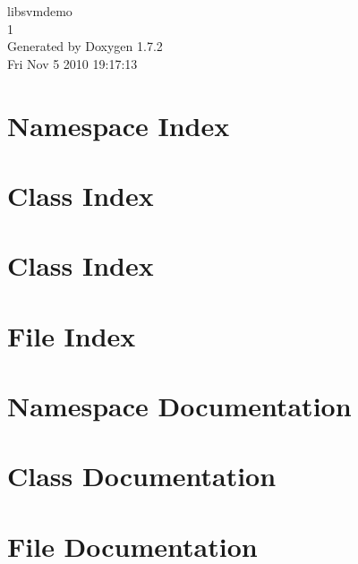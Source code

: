 \documentclass[a4paper]{book}
\begin{document}
\hypersetup{pageanchor=false}
\begin{titlepage}
\vspace*{7cm}
\begin{center}
{\Large libsvmdemo \\[1ex]\large 1 }\\
\vspace*{1cm}
{\large Generated by Doxygen 1.7.2}\\
\vspace*{0.5cm}
{\small Fri Nov 5 2010 19:17:13}\\
\end{center}
\end{titlepage}
\clearemptydoublepage
{}
\tableofcontents
\clearemptydoublepage
{}
\hypersetup{pageanchor=true}
\chapter{Namespace Index}

\chapter{Class Index}

\chapter{Class Index}

\chapter{File Index}

\chapter{Namespace Documentation}



\chapter{Class Documentation}



















\chapter{File Documentation}














\printindex
\end{document}
